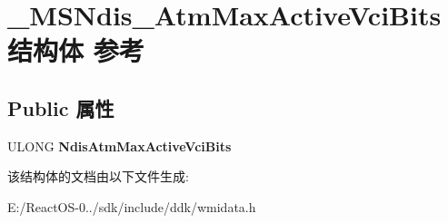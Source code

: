 \hypertarget{struct___m_s_ndis___atm_max_active_vci_bits}{}\section{\+\_\+\+M\+S\+Ndis\+\_\+\+Atm\+Max\+Active\+Vci\+Bits结构体 参考}
\label{struct___m_s_ndis___atm_max_active_vci_bits}
\subsection*{Public 属性}
\begin{DoxyCompactItemize}
\item 
\mbox{\label{struct___m_s_ndis___atm_max_active_vci_bits_a3f4beccaa520cb9b3d3c8a14a0a3f78a}} 
U\+L\+O\+NG {\bfseries Ndis\+Atm\+Max\+Active\+Vci\+Bits}
\end{DoxyCompactItemize}


该结构体的文档由以下文件生成\+:\begin{DoxyCompactItemize}
\item 
E\+:/\+React\+O\+S-\/0../sdk/include/ddk/wmidata.\+h\end{DoxyCompactItemize}
